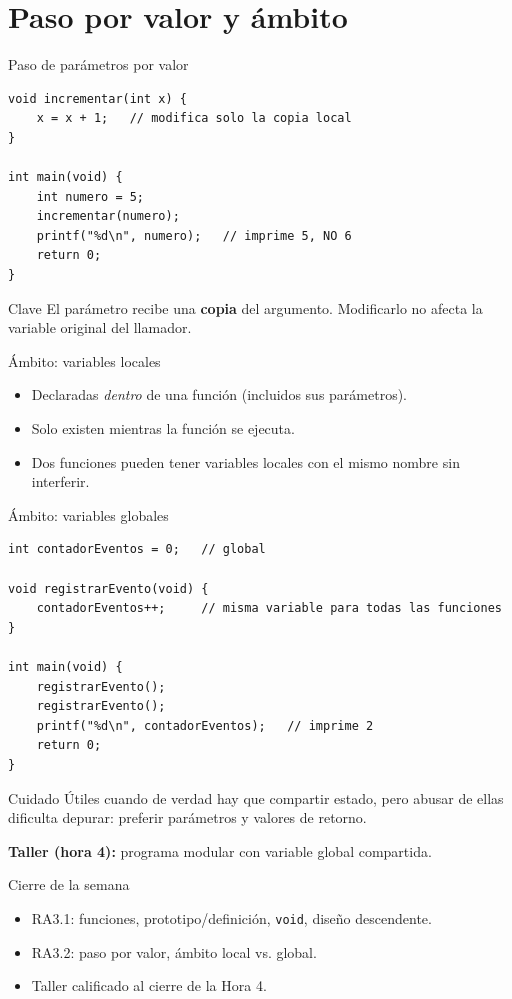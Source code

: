 \documentclass[11pt]{beamer}
\begin{document}
\section{Paso por valor y ámbito}

\begin{frame}[fragile]{Paso de parámetros por valor}
\begin{lstlisting}
void incrementar(int x) {
    x = x + 1;   // modifica solo la copia local
}

int main(void) {
    int numero = 5;
    incrementar(numero);
    printf("%d\n", numero);   // imprime 5, NO 6
    return 0;
}
\end{lstlisting}
  \begin{alertblock}{Clave}
    El parámetro recibe una \textbf{copia} del argumento. Modificarlo no afecta la variable
    original del llamador.
  \end{alertblock}
\end{frame}

\begin{frame}[fragile]{Ámbito: variables locales}
  \begin{itemize}
    \item Declaradas \emph{dentro} de una función (incluidos sus parámetros).
    \item Solo existen mientras la función se ejecuta.
    \item Dos funciones pueden tener variables locales con el mismo nombre sin interferir.
  \end{itemize}
\end{frame}

\begin{frame}[fragile]{Ámbito: variables globales}
\begin{lstlisting}
int contadorEventos = 0;   // global

void registrarEvento(void) {
    contadorEventos++;     // misma variable para todas las funciones
}

int main(void) {
    registrarEvento();
    registrarEvento();
    printf("%d\n", contadorEventos);   // imprime 2
    return 0;
}
\end{lstlisting}
  \begin{alertblock}{Cuidado}
    Útiles cuando de verdad hay que compartir estado, pero abusar de ellas dificulta depurar:
    preferir parámetros y valores de retorno.
  \end{alertblock}
  \vfill
  \textbf{Taller (hora 4):} programa modular con variable global compartida.
\end{frame}

\begin{frame}{Cierre de la semana}
  \begin{itemize}
    \item RA3.1: funciones, prototipo/definición, \texttt{void}, diseño descendente.
    \item RA3.2: paso por valor, ámbito local vs. global.
    \item Taller calificado al cierre de la Hora 4.
  \end{itemize}
\end{frame}
\end{document}
